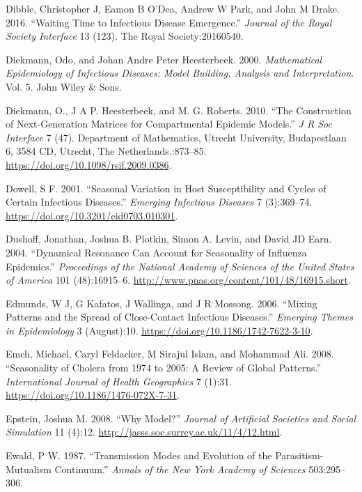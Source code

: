 \documentclass[]{book}
\theoremstyle{definition}
\theoremstyle{definition}
\theoremstyle{definition}
\theoremstyle{remark}
\begin{document}
\leavevmode\hypertarget{ref-dibble16}{}%
Dibble, Christopher J, Eamon B O'Dea, Andrew W Park, and John M Drake.
2016. ``Waiting Time to Infectious Disease Emergence.'' \emph{Journal of
the Royal Society Interface} 13 (123). The Royal Society:20160540.

\leavevmode\hypertarget{ref-diekmann00}{}%
Diekmann, Odo, and Johan Andre Peter Heesterbeek. 2000.
\emph{Mathematical Epidemiology of Infectious Diseases: Model Building,
Analysis and Interpretation}. Vol. 5. John Wiley \& Sons.

\leavevmode\hypertarget{ref-diekmann10}{}%
Diekmann, O., J A P. Heesterbeek, and M. G. Roberts. 2010. ``The
Construction of Next-Generation Matrices for Compartmental Epidemic
Models.'' \emph{J R Soc Interface} 7 (47). Department of Mathematics,
Utrecht University, Budapestlaan 6, 3584 CD, Utrecht, The
Netherlands.:873--85. \url{https://doi.org/10.1098/rsif.2009.0386}.

\leavevmode\hypertarget{ref-dowell01}{}%
Dowell, S F. 2001. ``Seasonal Variation in Host Susceptibility and
Cycles of Certain Infectious Diseases.'' \emph{Emerging Infectious
Diseases} 7 (3):369--74. \url{https://doi.org/10.3201/eid0703.010301}.

\leavevmode\hypertarget{ref-dushoff04}{}%
Dushoff, Jonathan, Joshua B. Plotkin, Simon A. Levin, and David JD Earn.
2004. ``Dynamical Resonance Can Account for Seasonality of Influenza
Epidemics.'' \emph{Proceedings of the National Academy of Sciences of
the United States of America} 101 (48):16915--6.
\url{http://www.pnas.org/content/101/48/16915.short}.

\leavevmode\hypertarget{ref-edmunds06}{}%
Edmunds, W J, G Kafatos, J Wallinga, and J R Mossong. 2006. ``Mixing
Patterns and the Spread of Close-Contact Infectious Diseases.''
\emph{Emerging Themes in Epidemiology} 3 (August):10.
\url{https://doi.org/10.1186/1742-7622-3-10}.

\leavevmode\hypertarget{ref-emch08}{}%
Emch, Michael, Caryl Feldacker, M Sirajul Islam, and Mohammad Ali. 2008.
``Seasonality of Cholera from 1974 to 2005: A Review of Global
Patterns.'' \emph{International Journal of Health Geographics} 7 (1):31.
\url{https://doi.org/10.1186/1476-072X-7-31}.

\leavevmode\hypertarget{ref-epstein08}{}%
Epstein, Joshua M. 2008. ``Why Model?'' \emph{Journal of Artificial
Societies and Social Simulation} 11 (4):12.
\url{http://jasss.soc.surrey.ac.uk/11/4/12.html}.

\leavevmode\hypertarget{ref-ewald87}{}%
Ewald, P W. 1987. ``Transmission Modes and Evolution of the
Parasitism-Mutualism Continuum.'' \emph{Annals of the New York Academy
of Sciences} 503:295--306.
\end{document}
